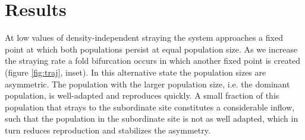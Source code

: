 \documentclass{revtex4}
\begin{document}
\section{Results}



\noindent At low values of density-independent straying the system approaches a fixed point at which both populations persist at equal population size. 
As we increase the straying rate a fold bifurcation occurs in which another fixed point is created (figure \ref{fig:traj}, inset). 
In this alternative state the population sizes are asymmetric. 
The population with the larger population size, i.e. the dominant population, is well-adapted and reproduces quickly. 
A small fraction of this population that strays to the subordinate site constitutes a considerable inflow, such that the population in the subordinate site is not as well adapted, which in turn reduces reproduction and stabilizes the asymmetry. 
\end{document}
